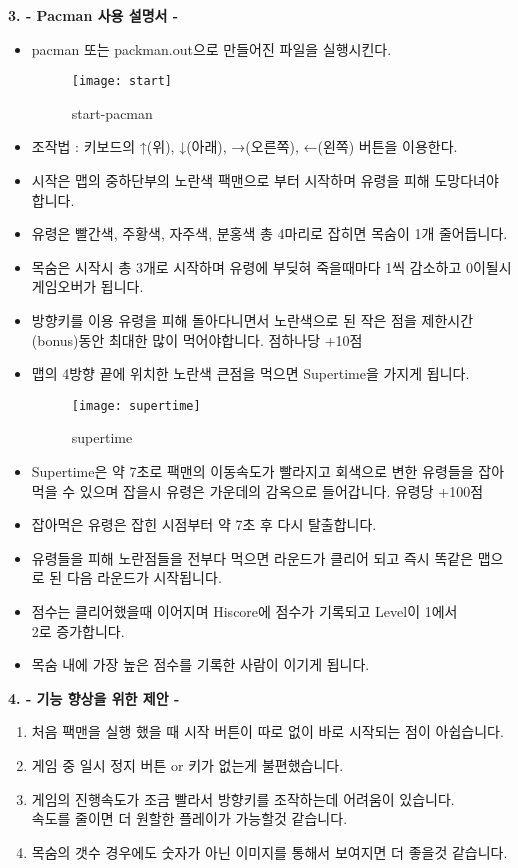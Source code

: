 \documentclass{article}
\begin{document}
\newpage
\begin{large}\textbf{3. - Pacman 사용 설명서 -}\end{large}
\begin{itemize}
\item pacman 또는 packman.out으로 만들어진 파일을 실행시킨다.
\begin{figure}[!h]
\centering
\texttt{[image: start]}
\caption{start-pacman}%
\end{figure}
\item 조작법 : 키보드의 ↑(위), ↓(아래), →(오른쪽), ←(왼쪽) 버튼을 이용한다.
\item 시작은 맵의 중하단부의 노란색 팩맨으로 부터 시작하며 유령을 피해 도망다녀야 합니다.
\item 유령은 빨간색, 주황색, 자주색, 분홍색 총 4마리로 잡히면 목숨이 1개 줄어듭니다.
\item 목숨은 시작시 총 3개로 시작하며 유령에 부딪혀 죽을때마다 1씩 감소하고 0이될시 게임오버가 됩니다.
\item 방향키를 이용 유령을 피해 돌아다니면서 노란색으로 된 작은 점을 제한시간(bonus)동안 최대한 많이 먹어야합니다. 점하나당 +10점
\item 맵의 4방향 끝에 위치한 노란색 큰점을 먹으면 Supertime을 가지게 됩니다.
\newpage

\begin{figure}[!h]
\centering
\texttt{[image: supertime]}
\caption{supertime}%
\end{figure}

\item Supertime은 약 7초로 팩맨의 이동속도가 빨라지고 회색으로 변한 유령들을 잡아먹을 수 있으며 잡을시 유령은 가운데의 감옥으로 들어갑니다. 유령당 +100점
\item 잡아먹은 유령은 잡힌 시점부터 약 7초 후 다시 탈출합니다.
\item 유령들을 피해 노란점들을 전부다 먹으면 라운드가 클리어 되고 즉시 똑같은 맵으로 된 다음 라운드가 시작됩니다.
\item 점수는 클리어했을때 이어지며 Hiscore에 점수가 기록되고 Level이 1에서\\ 2로 증가합니다.
\item 목숨 내에 가장 높은 점수를 기록한 사람이 이기게 됩니다.
\end{itemize}

\newpage
\begin{large}\textbf{4. - 기능 향상을 위한 제안 -}\end{large}
\begin{enumerate}
\item 처음 팩맨을 실행 했을 때 시작 버튼이 따로 없이 바로 시작되는 점이 아쉽습니다.
\item 게임 중 일시 정지 버튼 or 키가 없는게 불편했습니다.
\item 게임의 진행속도가 조금 빨라서 방향키를 조작하는데 어려움이 있습니다.\\ 속도를 줄이면 더 원할한 플레이가 가능할것 같습니다.
\item 목숨의 갯수 경우에도 숫자가 아닌 이미지를 통해서 보여지면 더 좋을것 같습니다.
\end{enumerate}
\end{document}
